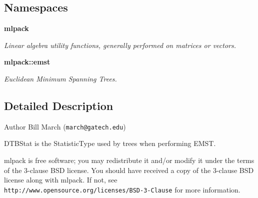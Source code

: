 \subsection*{Namespaces}
\begin{DoxyCompactItemize}
\item 
 \textbf{ mlpack}
\begin{DoxyCompactList}\small\item\em Linear algebra utility functions, generally performed on matrices or vectors. \end{DoxyCompactList}\item 
 \textbf{ mlpack\+::emst}
\begin{DoxyCompactList}\small\item\em Euclidean Minimum Spanning Trees. \end{DoxyCompactList}\end{DoxyCompactItemize}


\subsection{Detailed Description}
\begin{DoxyAuthor}{Author}
Bill March ({\tt march@gatech.\+edu})
\end{DoxyAuthor}
D\+T\+B\+Stat is the Statistic\+Type used by trees when performing E\+M\+ST.

mlpack is free software; you may redistribute it and/or modify it under the terms of the 3-\/clause B\+SD license. You should have received a copy of the 3-\/clause B\+SD license along with mlpack. If not, see {\tt http\+://www.\+opensource.\+org/licenses/\+B\+S\+D-\/3-\/\+Clause} for more information. 